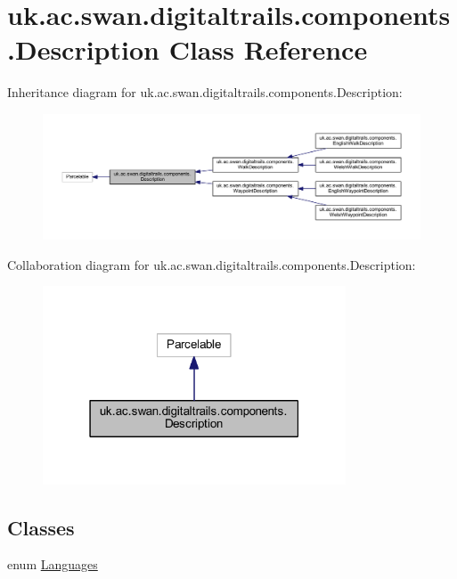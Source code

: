 \hypertarget{classuk_1_1ac_1_1swan_1_1digitaltrails_1_1components_1_1_description}{\section{uk.\+ac.\+swan.\+digitaltrails.\+components.\+Description Class Reference}
\label{classuk_1_1ac_1_1swan_1_1digitaltrails_1_1components_1_1_description}
}


Inheritance diagram for uk.\+ac.\+swan.\+digitaltrails.\+components.\+Description\+:\nopagebreak
\begin{figure}[H]
\begin{center}
\leavevmode
\includegraphics[width=350pt]{classuk_1_1ac_1_1swan_1_1digitaltrails_1_1components_1_1_description__inherit__graph}
\end{center}
\end{figure}


Collaboration diagram for uk.\+ac.\+swan.\+digitaltrails.\+components.\+Description\+:\nopagebreak
\begin{figure}[H]
\begin{center}
\leavevmode
\includegraphics[width=255pt]{classuk_1_1ac_1_1swan_1_1digitaltrails_1_1components_1_1_description__coll__graph}
\end{center}
\end{figure}
\subsection*{Classes}
\begin{DoxyCompactItemize}
\item 
enum \hyperlink{enumuk_1_1ac_1_1swan_1_1digitaltrails_1_1components_1_1_description_1_1_languages}{Languages}
\end{DoxyCompactItemize}
